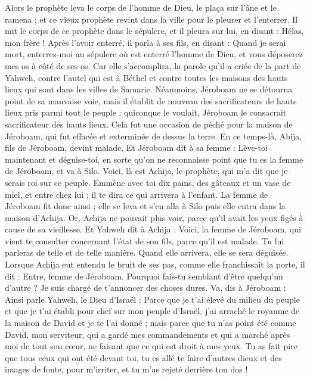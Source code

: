 \begin{multicols}{2}
Alors le prophète leva le corps de l'homme de Dieu, le plaça sur l'âne et le ramena ; et ce vieux prophète revint dans la ville pour le pleurer et l'enterrer.
Il mit le corps de ce prophète dans le sépulcre, et il pleura sur lui, en disant : Hélas, mon frère !
Après l’avoir enterré, il parla à ses fils, en disant : Quand je serai mort, enterrez-moi au sépulcre où est enterré l'homme de Dieu, et vous déposerez mes os à côté de ses os.
Car elle s’accomplira, la parole qu’il a criée de la part de Yahweh, contre l'autel qui est à Béthel et contre toutes les maisons des hauts lieux qui sont dans les villes de Samarie.
Néanmoins, Jéroboam ne se détourna point de sa mauvaise voie, mais il établit de nouveau des sacrificateurs de hauts lieux pris parmi tout le peuple ; quiconque le voulait, Jéroboam le consacrait sacrificateur des hauts lieux.
Cela fut une occasion de péché pour la maison de Jéroboam, qui fut effacée et exterminée de dessus la terre.
\VerseOne{}En ce temps-là, Abija, fils de Jéroboam, devint malade.
Et Jéroboam dit à sa femme : Lève-toi maintenant et déguise-toi, en sorte qu'on ne reconnaisse point que tu es la femme de Jéroboam, et va à Silo. Voici, là est Achija, le prophète, qui m'a dit que je serais roi sur ce peuple.
Emmène avec toi dix pains, des gâteaux et un vase de miel, et entre chez lui ; il te dira ce qui arrivera à l’enfant.
La femme de Jéroboam fit donc ainsi ; elle se leva et s'en alla à Silo puis elle entra dans la maison d'Achija. Or, Achija ne pouvait plus voir, parce qu’il avait les yeux figés à cause de sa vieillesse.
Et Yahweh dit à Achija : Voici, la femme de Jéroboam, qui vient te consulter concernant l’état de son fils, parce qu'il est malade. Tu lui parleras de telle et de telle manière. Quand elle arrivera, elle se sera déguisée.
Lorsque Achija eut entendu le bruit de ses pas, comme elle franchissait la porte, il dit : Entre, femme de Jéroboam. Pourquoi fais-tu semblant d'être quelqu’un d’autre ? Je suis chargé de t’annoncer des choses dures.
Va, dis à Jéroboam : Ainsi parle Yahweh, le Dieu d'Israël : Parce que je t'ai élevé du milieu du peuple et que je t'ai établi pour chef sur mon peuple d'Israël,
j'ai arraché le royaume de la maison de David et je te l'ai donné ; mais parce que tu n'as point été comme David, mon serviteur, qui a gardé mes commandements et qui a marché après moi de tout son cœur, ne faisant que ce qui est droit à mes yeux.
Tu as fait pire que tous ceux qui ont été devant toi, tu es allé te faire d'autres dieux et des images de fonte, pour m'irriter, et tu m'as rejeté derrière ton dos !

\end{multicols}
